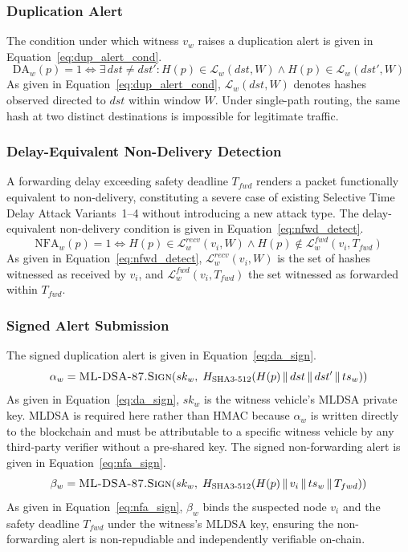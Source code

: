 \documentclass[12pt, a4paper]{report}
\begin{document}
\subsubsection{Duplication Alert}
The condition under which witness $v_w$ raises a duplication
alert is given in Equation~\eqref{eq:dup_alert_cond}.
\begin{equation}
\text{DA}_w(p){=}1\iff
\exists\,dst{\neq}dst':
H(p)\in\mathcal{L}_w(dst,W)
\land H(p)\in\mathcal{L}_w(dst',W)
\label{eq:dup_alert_cond}
\end{equation}
As given in Equation~\eqref{eq:dup_alert_cond},
$\mathcal{L}_w(dst,W)$ denotes hashes observed directed
to $dst$ within window $W$. Under single-path routing,
the same hash at two distinct destinations is impossible
for legitimate traffic.

\subsubsection{Delay-Equivalent Non-Delivery Detection}
A forwarding delay exceeding safety deadline $T_{fwd}$
renders a packet functionally equivalent to non-delivery,
constituting a severe case of existing Selective Time Delay
Attack Variants~1--4 without introducing a new attack type.
The delay-equivalent non-delivery condition is given in
Equation~\eqref{eq:nfwd_detect}.
\begin{equation}
\text{NFA}_w(p){=}1\iff
H(p)\in\mathcal{L}_w^{recv}(v_i,W)
\land H(p)\notin\mathcal{L}_w^{fwd}(v_i,T_{fwd})
\label{eq:nfwd_detect}
\end{equation}
As given in Equation~\eqref{eq:nfwd_detect},
$\mathcal{L}_w^{recv}(v_i,W)$ is the set of hashes
witnessed as received by $v_i$, and
$\mathcal{L}_w^{fwd}(v_i,T_{fwd})$ the set witnessed as
forwarded within $T_{fwd}$.


\subsubsection{Signed Alert Submission}
The signed duplication alert is given in
Equation~\eqref{eq:da_sign}.
\begin{equation}
\alpha_w = \textsc{ML-DSA-87.Sign}\!\left(sk_w,\;
H_{\text{SHA3-512}}\!\left(
H(p) \,\|\, dst \,\|\, dst' \,\|\, ts_w
\right)\right)
\label{eq:da_sign}
\end{equation}
As given in Equation~\eqref{eq:da_sign}, $sk_w$
is the witness vehicle's \ac{MLDSA} private key.
\ac{MLDSA} is required here rather than \ac{HMAC}
because $\alpha_w$ is written directly to the
blockchain and must be attributable to a specific
witness vehicle by any third-party verifier without
a pre-shared key. The signed non-forwarding alert
is given in Equation~\eqref{eq:nfa_sign}.
\begin{equation}
\beta_w = \textsc{ML-DSA-87.Sign}\!\left(sk_w,\;
H_{\text{SHA3-512}}\!\left(
H(p) \,\|\, v_i \,\|\, ts_w \,\|\, T_{fwd}
\right)\right)
\label{eq:nfa_sign}
\end{equation}
As given in Equation~\eqref{eq:nfa_sign}, $\beta_w$
binds the suspected node $v_i$ and the safety
deadline $T_{fwd}$ under the witness's \ac{MLDSA}
key, ensuring the non-forwarding alert is
non-repudiable and independently verifiable
on-chain.
\end{document}
